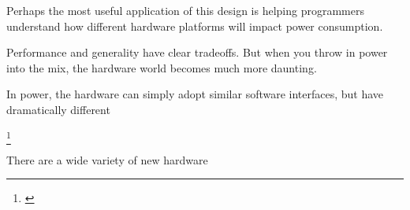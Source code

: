 \documentclass[12pt,twoside]{reedthesis}
\begin{document}
		Perhaps the most useful application of this design is helping programmers understand how different hardware platforms will impact power consumption.

		Performance and generality have clear tradeoffs. But when you throw in power into the mix, the hardware world becomes much more daunting.

		In power, the hardware can simply adopt similar software interfaces, but have dramatically different

		\footnote{\cite{Taylor:2013}}

		There are a wide variety of new hardware








\end{document}
